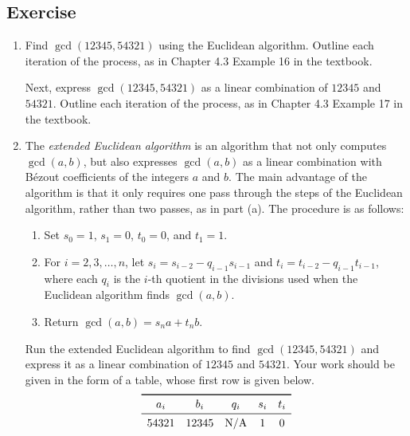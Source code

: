 \documentclass{article}
\newcounter{counter}
\newcommand{\Exercise}{Exercise \stepcounter{counter}\thecounter}
\begin{document}
\subsection*{\Exercise}
    \begin{enumerate}
        \item Find $\gcd(12345, 54321)$ using the Euclidean algorithm. Outline each iteration of the process, as in Chapter 4.3 Example 16 in the textbook.
        
        \vspace{1.5mm}
        Next, express $\gcd(12345, 54321)$ as a linear combination of $12345$ and $54321$. Outline each iteration of the process, as in Chapter 4.3 Example 17 in the textbook.
        
        \item The \textit{extended Euclidean algorithm} is an algorithm that not only computes $\gcd(a, b)$, but also expresses $\gcd(a, b)$ as a linear combination with B\'ezout coefficients of the integers $a$ and $b$. The main advantage of the algorithm is that it only requires one pass through the steps of the Euclidean algorithm, rather than two passes, as in part (a). The procedure is as follows:
        \begin{enumerate}[leftmargin=1.2in]
            \item [\textbf{Initialization.}] Set $s_{0} = 1$, $s_{1} = 0$, $t_{0} = 0$, and $t_{1} = 1$.
            \item [\textbf{Inductive Step.}] For $i = 2,3,\dots,n$, let $s_{i} = s_{i - 2} - q_{i - 1}s_{i - 1}$ and $t_{i} = t_{i - 2} - q_{i - 1}t_{i - 1}$, where each $q_{i}$ is the $i$-th quotient in the divisions used when the Euclidean algorithm finds $\gcd(a,b)$.
            \item [\textbf{Termination.}] Return $\gcd(a, b) = s_{n}a + t_{n}b$. 
        \end{enumerate}
        
        \vspace{2mm}
        Run the extended Euclidean algorithm to find $\gcd(12345, 54321)$ and express it as a linear combination of $12345$ and $54321$. Your work should be given in the form of a table, whose first row is given below.
        $$\begin{array}{ccccc}
            \toprule
            a_{i} & b_{i} & q_{i} & s_{i} & t_{i} \\
            \midrule
            54321 & 12345 & \text{N/A} & 1 & 0
        \end{array}$$
    \end{enumerate}
\end{document}
